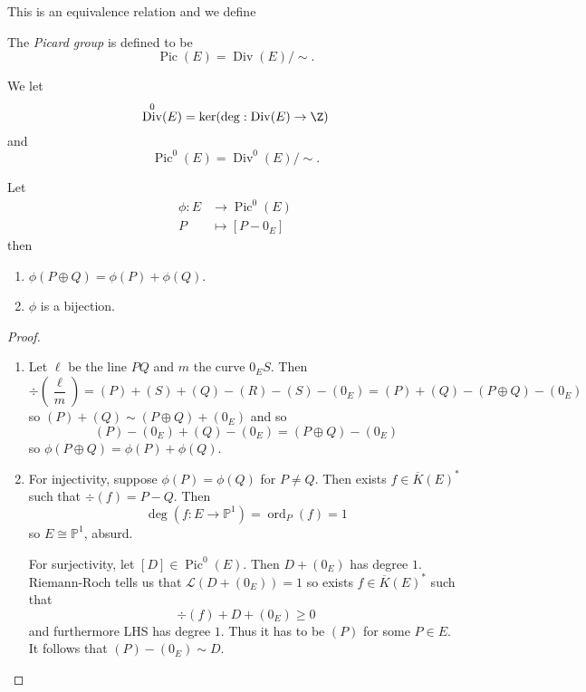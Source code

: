 \documentclass[a4paper]{article}
\theoremstyle{definition}
\theoremstyle{theorem}
\renewcommand*{\P}{\mathbb{P}}
\DeclareMathOperator{\ord}{ord}
\DeclareMathOperator{\Div}{Div} %
\DeclareMathOperator{\Pic}{Pic} %
\begin{document}
This is an equivalence relation and we define

\begin{definition}
  The \emph{Picard group} is defined to be
  \[
    \Pic(E) = \Div (E)/\sim.
  \]
\end{definition}

\begin{definition}
  We let
  \[
    \Div^0(E) = \ker (\deg: \Div(E) \to \Z)
  \]
  and
  \[
    \Pic^0(E) = \Div^0(E)/\sim.
  \]
\end{definition}

\begin{proposition}
  Let
  \begin{align*}
    \phi: E &\to \Pic^0(E) \\
    P &\mapsto [P - 0_E]
  \end{align*}
  then
  \begin{enumerate}
  \item \(\phi(P \oplus Q) = \phi(P) + \phi(Q)\).
  \item \(\phi\) is a bijection.
  \end{enumerate}
\end{proposition}

\begin{proof}\leavevmode
  \begin{enumerate}
  \item Let \(\ell\) be the line \(PQ\) and \(m\) the curve \(0_ES\). Then
    \[
      \div (\frac{\ell}{m})
      = (P) + (S) + (Q) - (R) - (S) - (0_E)
      = (P) + (Q) - (P \oplus Q) - (0_E)
    \]
    so \((P) + (Q) \sim (P \oplus Q) + (0_E)\) and so
    \[
      (P) - (0_E) + (Q) - (0_E) = (P \oplus Q) - (0_E)
    \]
    so \(\phi(P \oplus Q) = \phi(P) + \phi(Q)\).
  \item For injectivity, suppose \(\phi(P) = \phi(Q)\) for \(P \neq Q\). Then exists \(f \in \overline K(E)^*\) such that \(\div (f) = P - Q\). Then
    \[
      \deg (f: E \to \P^1) = \ord_P(f) = 1
    \]
    so \(E \cong \P^1\), absurd.

    For surjectivity, let \([D] \in \Pic^0(E)\). Then \(D + (0_E)\) has degree \(1\). Riemann-Roch tells us that \(\mathcal L(D + (0_E)) = 1\) so exists \(f \in \overline K(E)^*\) such that
    \[
      \div(f) + D + (0_E) \geq 0
    \]
    and furthermore LHS has degree \(1\). Thus it has to be \((P)\) for some \(P \in E\). It follows that \((P) - (0_E) \sim D\).
  \end{enumerate}
\end{proof}
\end{document}
